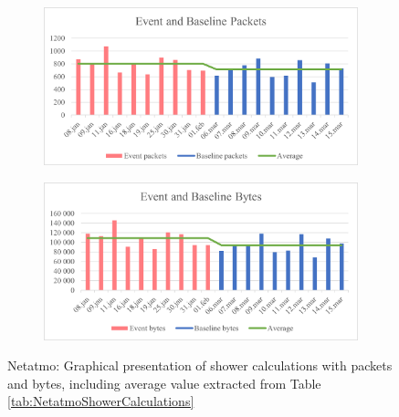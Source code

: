 \begin{figure}[H]
    \centering
    \begin{subfigure}{1\textwidth}
       \centering
       \includegraphics[width=1\hsize]{figures/Netatmo_Shower_Calculations_Packets.png} 
    \end{subfigure}
    \begin{subfigure}{1\textwidth}
        \centering
        \includegraphics[width=1\hsize]{figures/Netatmo_Shower_Calculations_Bytes.png} 
    \end{subfigure}
    \caption{Netatmo: Graphical presentation of shower calculations with packets and bytes, including average value extracted from Table \ref{tab:NetatmoShowerCalculations}}
    \label{fig:NetatmoShowerCalculations}
\end{figure}

